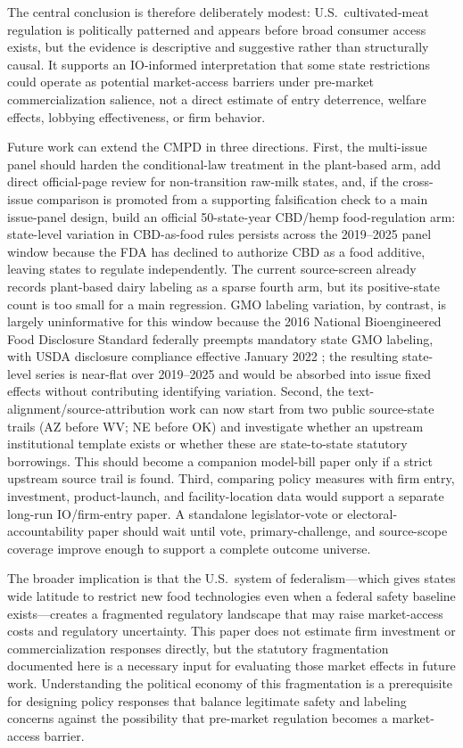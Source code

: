 \documentclass[12pt]{article}
\begin{document}
The central conclusion is therefore deliberately modest: U.S.\ cultivated-meat regulation is politically patterned and appears before broad consumer access exists, but the evidence is descriptive and suggestive rather than structurally causal.  It supports an IO-informed interpretation that some state restrictions could operate as potential market-access barriers under pre-market commercialization salience, not a direct estimate of entry deterrence, welfare effects, lobbying effectiveness, or firm behavior.

Future work can extend the CMPD in three directions.  First, the multi-issue panel should harden the conditional-law treatment in the plant-based arm, add direct official-page review for non-transition raw-milk states, and, if the cross-issue comparison is promoted from a supporting falsification check to a main issue-panel design, build an official 50-state-year CBD/hemp food-regulation arm: state-level variation in CBD-as-food rules persists across the 2019--2025 panel window because the FDA has declined to authorize CBD as a food additive, leaving states to regulate independently.  The current source-screen already records plant-based dairy labeling as a sparse fourth arm, but its positive-state count is too small for a main regression.  GMO labeling variation, by contrast, is largely uninformative for this window because the 2016 National Bioengineered Food Disclosure Standard \citep{publaw114216} federally preempts mandatory state GMO labeling, with USDA disclosure compliance effective January 2022 \citep{usda2018nbfds}; the resulting state-level series is near-flat over 2019--2025 and would be absorbed into issue fixed effects without contributing identifying variation.  Second, the text-alignment/source-attribution work can now start from two public source-state trails (AZ before WV; NE before OK) and investigate whether an upstream institutional template exists or whether these are state-to-state statutory borrowings.  This should become a companion model-bill paper only if a strict upstream source trail is found.  Third, comparing policy measures with firm entry, investment, product-launch, and facility-location data would support a separate long-run IO/firm-entry paper.  A standalone legislator-vote or electoral-accountability paper should wait until vote, primary-challenge, and source-scope coverage improve enough to support a complete outcome universe.

The broader implication is that the U.S.\ system of federalism---which gives states wide latitude to restrict new food technologies even when a federal safety baseline exists---creates a fragmented regulatory landscape that may raise market-access costs and regulatory uncertainty.  This paper does not estimate firm investment or commercialization responses directly, but the statutory fragmentation documented here is a necessary input for evaluating those market effects in future work.  Understanding the political economy of this fragmentation is a prerequisite for designing policy responses that balance legitimate safety and labeling concerns against the possibility that pre-market regulation becomes a market-access barrier.
\end{document}

